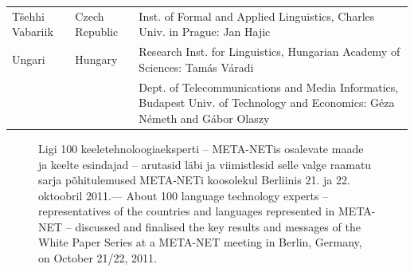 \documentclass[]{../metanetpaper}
\begin{document}
\begin{longtable}{llp{105mm}}
\addlinespace 
  Tšehhi Vabariik & \textcolor{grey1}{Czech Republic} & Inst. of Formal and Applied Linguistics, Charles Univ. in Prague: Jan Hajic \\ \addlinespace
  Ungari & \textcolor{grey1}{Hungary} & Research Inst. for Linguistics, Hungarian Academy of Sciences: Tamás Váradi\\  \addlinespace
  & & Dept. of Telecommunications and Media Informatics, Budapest Univ. of Technology and Economics: Géza Németh and Gábor Olaszy\\
\end{longtable}
\normalsize

\renewcommand*{\figureformat}{}
\renewcommand*{\captionformat}{}

\begin{figure}[htbp]
  \center
  \caption{Ligi 100 keeletehnoloogiaeksperti -- META-NETis osalevate maade ja keelte esindajad -- arutasid läbi ja viimistlesid selle valge raamatu sarja põhitulemused META-NETi koosolekul Berliinis 21. ja 22. oktoobril 2011.--- \textcolor{grey1}{About 100 language technology experts -- representatives of the countries and languages represented in META-NET -- discussed and finalised the key results and messages of the White Paper Series at a META-NET meeting in Berlin, Germany, on October 21/22, 2011.}}
\end{figure}

\cleardoublepage

\label{whitepaperseries}
\end{document}
